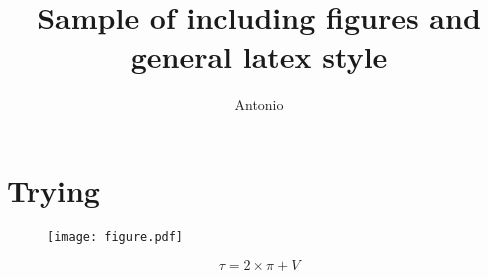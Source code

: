 \documentclass[a4paper,10pt]{article}
\title{Sample of including figures and general latex style}
\author{Antonio}
\begin{document}
\maketitle


\section{Trying}

\blindtext[5]

\begin{figure}
\begin{center}
\texttt{[image: figure.pdf]}
\caption{\blindtext[2]}
\end{center}
\end{figure}

\begin{equation}
\tau = 2 \times \pi + V
\end{equation}

\blindtext[3]
\end{document}
